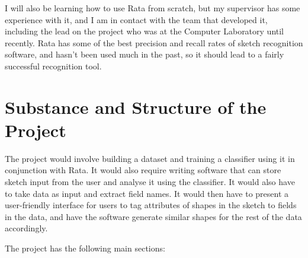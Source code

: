 I will also be learning how to use Rata from scratch, but my supervisor has some experience with it, and I am in contact with the team that developed it, including the lead on the project who was at the Computer Laboratory until recently. Rata has some of the best precision and recall rates of sketch recognition software, and hasn't been used much in the past, so it should lead to a fairly successful recognition tool.










\section*{Substance and Structure of the Project}
The project would involve building a dataset and training a classifier using it in conjunction with Rata. It would also require writing software that can store sketch input from the user and analyse it using the classifier. It would also have to take data as input and extract field names.
It would then have to present a user-friendly interface for users to tag attributes of shapes in the sketch to fields in the data, and have the software generate similar shapes for the rest of the data accordingly. 

The project has the following main sections:

